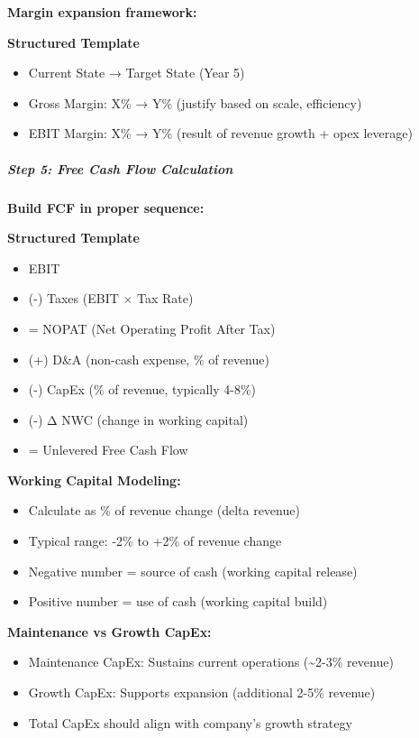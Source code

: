 \documentclass[11pt]{article}
\begin{document}
\textbf{Margin expansion framework:}

\textbf{Structured Template}
\begin{itemize}[leftmargin=*,itemsep=2pt,topsep=2pt]
\item {} Current State → Target State (Year 5)
\item {} Gross Margin: X\% → Y\% (justify based on scale, efficiency)
\item {} EBIT Margin: X\% → Y\% (result of revenue growth + opex leverage)
\end{itemize}

\subparagraph{Step 5: Free Cash Flow Calculation}\mbox{}\par

\textbf{Build FCF in proper sequence:}


\textbf{Structured Template}
\begin{itemize}[leftmargin=*,itemsep=2pt,topsep=2pt]
\item {} EBIT
\item {} (-) Taxes (EBIT × Tax Rate)
\item {} = NOPAT (Net Operating Profit After Tax)
\item {} (+) D\&A (non-cash expense, \% of revenue)
\item {} (-) CapEx (\% of revenue, typically 4-8\%)
\item {} (-) Δ NWC (change in working capital)
\item {} = Unlevered Free Cash Flow
\end{itemize}

\textbf{Working Capital Modeling:}

\begin{itemize}[leftmargin=*,itemsep=2pt,topsep=2pt]
\item {} Calculate as \% of revenue change (delta revenue)
\item {} Typical range: -2\% to +2\% of revenue change
\item {} Negative number = source of cash (working capital release)
\item {} Positive number = use of cash (working capital build)
\end{itemize}

\textbf{Maintenance vs Growth CapEx:}

\begin{itemize}[leftmargin=*,itemsep=2pt,topsep=2pt]
\item {} Maintenance CapEx: Sustains current operations (\textasciitilde{}2-3\% revenue)
\item {} Growth CapEx: Supports expansion (additional 2-5\% revenue)
\item {} Total CapEx should align with company's growth strategy
\end{itemize}
\end{document}
